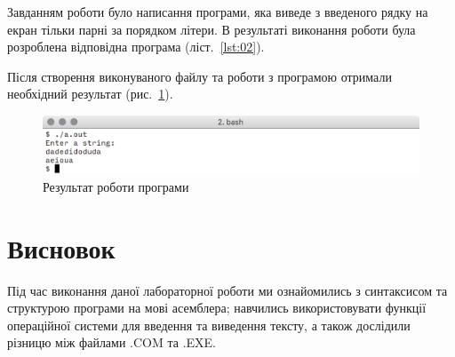 \documentclass[a4paper,oneside,DIV=12,12pt,headings=normal]{scrartcl}
\begin{document}
		Завданням роботи було написання програми, яка виведе з введеного рядку на екран тільки парні за порядком літери. В результаті виконання роботи була розроблена відповідна програма (ліст.~\ref{lst:02}).
				
		
		Після створення виконуваного файлу та роботи з програмою отримали необхідний результат (рис.~\ref{fig:02-run}).
		
		\begin{figure}[!htbp]
		\centering
			\includegraphics[width = \textwidth]{./assets/asmres.png}
		\caption{Результат роботи програми}
		\label{fig:02-run}
		\end{figure}
		
	\section{Висновок}
		Під час виконання даної лабораторної роботи ми ознайомились з синтаксисом та структурою програми на мові асемблера; навчились використовувати функції операційної системи для введення та виведення тексту, а також дослідили різницю між файлами .COM та .EXE.
\end{document}
